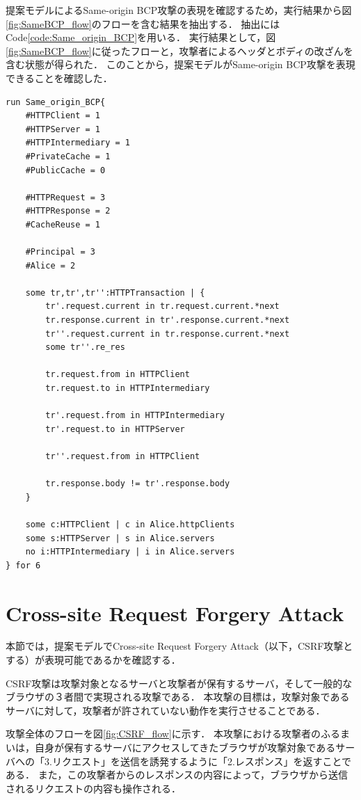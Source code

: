 \documentclass[12pt,a4paper]{jbook}
\begin{document}
提案モデルによるSame-origin BCP攻撃の表現を確認するため，実行結果から図\ref{fig:SameBCP_flow}のフローを含む結果を抽出する．
抽出にはCode\ref{code:Same_origin_BCP}を用いる．
実行結果として，図\ref{fig:SameBCP_flow}に従ったフローと，攻撃者によるヘッダとボディの改ざんを含む状態が得られた．
このことから，提案モデルがSame-origin BCP攻撃を表現できることを確認した．

\begin{lstlisting}[caption=Same-origin BCP攻撃の表現, label=code:Same_origin_BCP]
run Same_origin_BCP{
	#HTTPClient = 1
	#HTTPServer = 1
	#HTTPIntermediary = 1
	#PrivateCache = 1
	#PublicCache = 0

	#HTTPRequest = 3
	#HTTPResponse = 2
	#CacheReuse = 1

	#Principal = 3
	#Alice = 2

	some tr,tr',tr'':HTTPTransaction | {
		tr'.request.current in tr.request.current.*next
		tr.response.current in tr'.response.current.*next
		tr''.request.current in tr.response.current.*next
		some tr''.re_res

		tr.request.from in HTTPClient
		tr.request.to in HTTPIntermediary

		tr'.request.from in HTTPIntermediary
		tr'.request.to in HTTPServer

		tr''.request.from in HTTPClient

		tr.response.body != tr'.response.body
	}

	some c:HTTPClient | c in Alice.httpClients
	some s:HTTPServer | s in Alice.servers
	no i:HTTPIntermediary | i in Alice.servers
} for 6
\end{lstlisting}

\section{Cross-site Request Forgery Attack}
本節では，提案モデルでCross-site Request Forgery Attack\cite{cookie-model}（以下，CSRF攻撃とする）が表現可能であるかを確認する．

CSRF攻撃は攻撃対象となるサーバと攻撃者が保有するサーバ，そして一般的なブラウザの３者間で実現される攻撃である．
本攻撃の目標は，攻撃対象であるサーバに対して，攻撃者が許されていない動作を実行させることである．

攻撃全体のフローを図\ref{fig:CSRF_flow}に示す．
本攻撃における攻撃者のふるまいは，自身が保有するサーバにアクセスしてきたブラウザが攻撃対象であるサーバへの「3.リクエスト」を送信を誘発するように「2.レスポンス」を返すことである．
また，この攻撃者からのレスポンスの内容によって，ブラウザから送信されるリクエストの内容も操作される．
\end{document}

